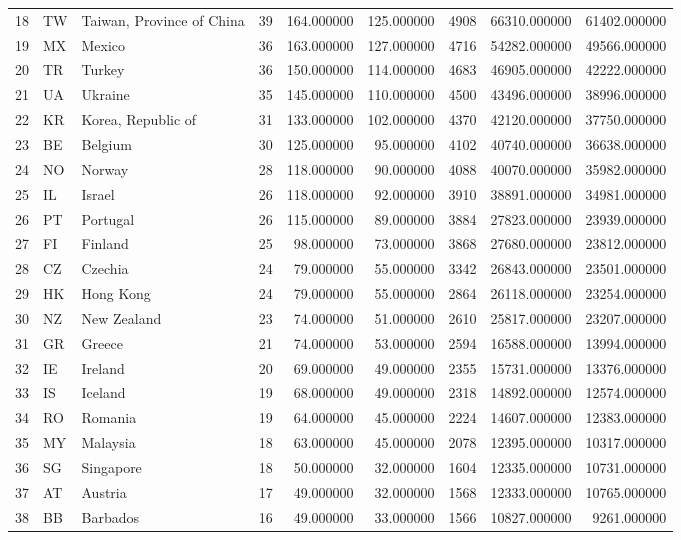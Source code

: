 \begin{tabular}{lllrrrrrr}
18 & TW & Taiwan, Province of China & 39 & 164.000000 & 125.000000 & 4908 & 66310.000000 & 61402.000000 \\
19 & MX & Mexico & 36 & 163.000000 & 127.000000 & 4716 & 54282.000000 & 49566.000000 \\
20 & TR & Turkey & 36 & 150.000000 & 114.000000 & 4683 & 46905.000000 & 42222.000000 \\
21 & UA & Ukraine & 35 & 145.000000 & 110.000000 & 4500 & 43496.000000 & 38996.000000 \\
22 & KR & Korea, Republic of & 31 & 133.000000 & 102.000000 & 4370 & 42120.000000 & 37750.000000 \\
23 & BE & Belgium & 30 & 125.000000 & 95.000000 & 4102 & 40740.000000 & 36638.000000 \\
24 & NO & Norway & 28 & 118.000000 & 90.000000 & 4088 & 40070.000000 & 35982.000000 \\
25 & IL & Israel & 26 & 118.000000 & 92.000000 & 3910 & 38891.000000 & 34981.000000 \\
26 & PT & Portugal & 26 & 115.000000 & 89.000000 & 3884 & 27823.000000 & 23939.000000 \\
27 & FI & Finland & 25 & 98.000000 & 73.000000 & 3868 & 27680.000000 & 23812.000000 \\
28 & CZ & Czechia & 24 & 79.000000 & 55.000000 & 3342 & 26843.000000 & 23501.000000 \\
29 & HK & Hong Kong & 24 & 79.000000 & 55.000000 & 2864 & 26118.000000 & 23254.000000 \\
30 & NZ & New Zealand & 23 & 74.000000 & 51.000000 & 2610 & 25817.000000 & 23207.000000 \\
31 & GR & Greece & 21 & 74.000000 & 53.000000 & 2594 & 16588.000000 & 13994.000000 \\
32 & IE & Ireland & 20 & 69.000000 & 49.000000 & 2355 & 15731.000000 & 13376.000000 \\
33 & IS & Iceland & 19 & 68.000000 & 49.000000 & 2318 & 14892.000000 & 12574.000000 \\
34 & RO & Romania & 19 & 64.000000 & 45.000000 & 2224 & 14607.000000 & 12383.000000 \\
35 & MY & Malaysia & 18 & 63.000000 & 45.000000 & 2078 & 12395.000000 & 10317.000000 \\
36 & SG & Singapore & 18 & 50.000000 & 32.000000 & 1604 & 12335.000000 & 10731.000000 \\
37 & AT & Austria & 17 & 49.000000 & 32.000000 & 1568 & 12333.000000 & 10765.000000 \\
38 & BB & Barbados & 16 & 49.000000 & 33.000000 & 1566 & 10827.000000 & 9261.000000 \\

\end{tabular}
